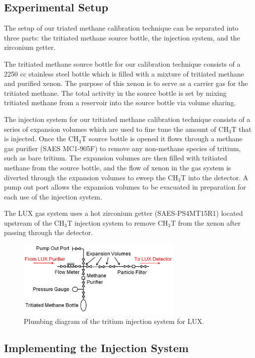 \subsection{Experimental Setup}

The setup of our triated methane calibration technique can be separated into three parts: the tritiated methane source bottle, the injection system,  and the zirconium getter.

The tritiated methane source bottle for our calibration technique consists of a 2250 cc stainless steel bottle which is filled with a mixture of tritiated methane and purified xenon.  The purpose of this xenon is to serve as a carrier gas for the tritiated methane.  The total activity in the source bottle is set by mixing tritiated methane from a reservoir into the source bottle via volume sharing.

The injection system for our tritiated methane calibration technique consists of a series of expansion volumes which are used to fine tune the amount of CH$_3$T that is injected.  Once the CH$_3$T source bottle is opened it flows through a methane gas purifier (SAES MC1-905F) to remove any non-methane species of tritium, such as bare tritium. The expansion volumes are then filled with tritiated methane from the source bottle, and the flow of xenon in the gas system is diverted through the expansion volumes to sweep the CH$_3$T into the detector.  A pump out port allows the expansion volumes to be evacuated in preparation for each use of the injection system.  

The LUX gas system uses a hot zirconium getter (SAES-PS4MT15R1) located upstream of the CH$_3$T injection system to remove CH$_3$T from the xenon after passing through the detector.  

\begin{figure}[H]\centering
\includegraphics[width=80mm]{TritiumPlumbing.png}
\caption{Plumbing diagram of the tritium injection system for LUX.}
\label{fig:Removal}
\end{figure}
 
\subsection{Implementing the Injection System}

